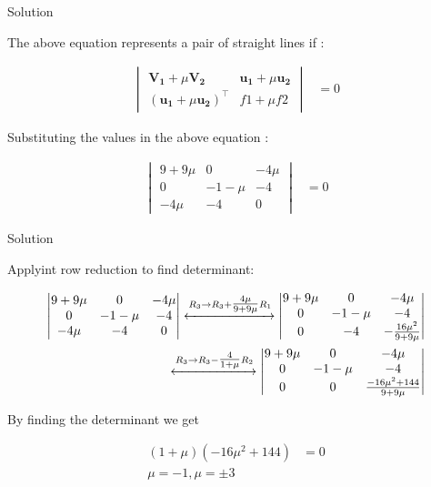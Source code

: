 \documentclass{beamer}
\numberwithin{equation}{section}
\theoremstyle{remark}
\newcommand{\mydet}[1]{\ensuremath{\begin{vmatrix}#1\end{vmatrix}}}
\let\vec\mathbf
\begin{document}
\begin{frame}{Solution}

The above equation represents a pair of straight lines if :

\begin{align}
  \mydet{\vec{V_1}+\mu\vec{V_2} & \vec{u_1}+\mu\vec{u_2}\\(\vec{u_1}+\mu\vec{u_2})^\top & f1 + \mu f2} &= 0
\end{align}

Substituting the values in the above equation :

\begin{align}
  \mydet{9+9\mu & 0 & -4\mu\\0 & -1-\mu & -4\\-4\mu & -4 & 0} &= 0
\end{align}

\end{frame}

\begin{frame}{Solution}

Applyint row reduction to find determinant:

\begin{align}
\mydet{9+9\mu & 0 & -4\mu\\0 & -1-\mu & -4\\-4\mu & -4 & 0} 
\xleftrightarrow{R_3 \to R_3 +\tfrac{4\mu}{9+9\mu}R_1}
\mydet{9+9\mu & 0 & -4\mu\\0 & -1-\mu & -4\\0 & -4 & -\tfrac{16\mu^2}{9+9\mu}}\\
\xleftrightarrow{R_3 \to R_3 -\tfrac{4}{1+\mu}R_2}
\mydet{9+9\mu & 0 & -4\mu\\0 & -1-\mu & -4\\0 & 0 & \tfrac{-16\mu^2+144}{9+9\mu}}
\end{align}

By finding the determinant we get 

\begin{align}
  (1+\mu)(-16\mu^2 + 144) &= 0\\
  \mu = -1 , \mu = \pm3
\end{align}

\end{frame}
\end{document}
